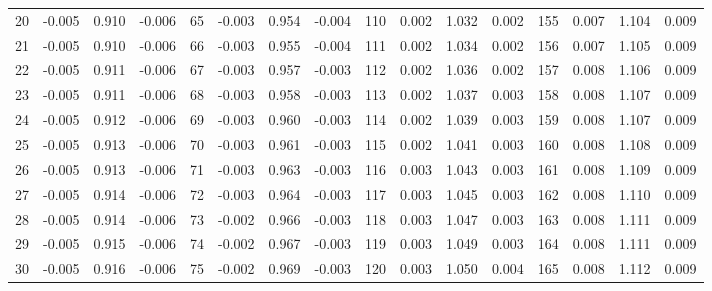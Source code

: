 \begin{table}
{\begin{tabular}{rrrr|rrrr|rrrr|crrr}
 20 & \tiny{ -0.005} &   0.910 & \tiny{ -0.006} &  65 & \tiny{ -0.003} &   0.954 & \tiny{ -0.004} & 110 & \tiny{  0.002} &   1.032 & \tiny{  0.002} & 155 & \tiny{  0.007} &   1.104 & \tiny{  0.009}\\
 21 & \tiny{ -0.005} &   0.910 & \tiny{ -0.006} &  66 & \tiny{ -0.003} &   0.955 & \tiny{ -0.004} & 111 & \tiny{  0.002} &   1.034 & \tiny{  0.002} & 156 & \tiny{  0.007} &   1.105 & \tiny{  0.009}\\
 22 & \tiny{ -0.005} &   0.911 & \tiny{ -0.006} &  67 & \tiny{ -0.003} &   0.957 & \tiny{ -0.003} & 112 & \tiny{  0.002} &   1.036 & \tiny{  0.002} & 157 & \tiny{  0.008} &   1.106 & \tiny{  0.009}\\
 23 & \tiny{ -0.005} &   0.911 & \tiny{ -0.006} &  68 & \tiny{ -0.003} &   0.958 & \tiny{ -0.003} & 113 & \tiny{  0.002} &   1.037 & \tiny{  0.003} & 158 & \tiny{  0.008} &   1.107 & \tiny{  0.009}\\
 24 & \tiny{ -0.005} &   0.912 & \tiny{ -0.006} &  69 & \tiny{ -0.003} &   0.960 & \tiny{ -0.003} & 114 & \tiny{  0.002} &   1.039 & \tiny{  0.003} & 159 & \tiny{  0.008} &   1.107 & \tiny{  0.009}\\
 25 & \tiny{ -0.005} &   0.913 & \tiny{ -0.006} &  70 & \tiny{ -0.003} &   0.961 & \tiny{ -0.003} & 115 & \tiny{  0.002} &   1.041 & \tiny{  0.003} & 160 & \tiny{  0.008} &   1.108 & \tiny{  0.009}\\
 26 & \tiny{ -0.005} &   0.913 & \tiny{ -0.006} &  71 & \tiny{ -0.003} &   0.963 & \tiny{ -0.003} & 116 & \tiny{  0.003} &   1.043 & \tiny{  0.003} & 161 & \tiny{  0.008} &   1.109 & \tiny{  0.009}\\
 27 & \tiny{ -0.005} &   0.914 & \tiny{ -0.006} &  72 & \tiny{ -0.003} &   0.964 & \tiny{ -0.003} & 117 & \tiny{  0.003} &   1.045 & \tiny{  0.003} & 162 & \tiny{  0.008} &   1.110 & \tiny{  0.009}\\
 28 & \tiny{ -0.005} &   0.914 & \tiny{ -0.006} &  73 & \tiny{ -0.002} &   0.966 & \tiny{ -0.003} & 118 & \tiny{  0.003} &   1.047 & \tiny{  0.003} & 163 & \tiny{  0.008} &   1.111 & \tiny{  0.009}\\
 29 & \tiny{ -0.005} &   0.915 & \tiny{ -0.006} &  74 & \tiny{ -0.002} &   0.967 & \tiny{ -0.003} & 119 & \tiny{  0.003} &   1.049 & \tiny{  0.003} & 164 & \tiny{  0.008} &   1.111 & \tiny{  0.009}\\
 30 & \tiny{ -0.005} &   0.916 & \tiny{ -0.006} &  75 & \tiny{ -0.002} &   0.969 & \tiny{ -0.003} & 120 & \tiny{  0.003} &   1.050 & \tiny{  0.004} & 165 & \tiny{  0.008} &   1.112 & \tiny{  0.009}\\

\end{tabular}}
\end{table}
